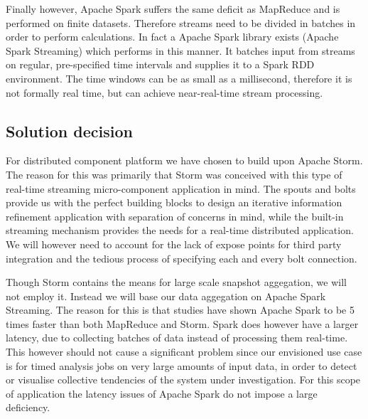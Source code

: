 Finally however, Apache Spark suffers the same deficit as MapReduce and is performed on finite datasets. Therefore streams need to be divided in batches in order to perform calculations. In fact a Apache Spark library exists (Apache Spark Streaming\cite{web:spark_streaming}) which performs in this manner. It batches input from streams on regular, pre-specified time intervals and supplies it to a Spark RDD environment. The time windows can be as small as a millisecond, therefore it is not formally real time, but can achieve near-real-time stream processing.


\subsection{Solution decision}
\label{sec:solution_decision}
For distributed component platform we have chosen to build upon Apache Storm. The reason for this was primarily that Storm was conceived with this type of real-time streaming micro-component application in mind. The spouts and bolts provide us with the perfect building blocks to design an iterative information refinement application with separation of concerns in mind, while the built-in streaming mechanism provides the needs for a real-time distributed application. We will however need to account for the lack of expose points for third party integration and the tedious process of specifying each and every bolt connection.

Though Storm contains the means for large scale snapshot aggegation, we will not employ it. Instead we will base our data aggegation on Apache Spark Streaming. The reason for this is that studies have shown Apache Spark to be 5 times faster than both MapReduce\cite{spark-vs-mapreduce} and Storm\cite{spark-vs-storm}. Spark does however have a larger latency, due to collecting batches of data instead of processing them real-time. This however should not cause a significant problem since our envisioned use case is for timed analysis jobs on very large amounts of input data, in order to detect or visualise collective tendencies of the system under investigation. For this scope of application the latency issues of Apache Spark do not impose a large deficiency.

